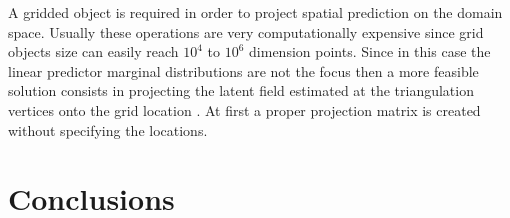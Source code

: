 \documentclass[
  12pt,
  a4paper,
  oneside]{book}
\theoremstyle{definition}
\theoremstyle{definition}
\theoremstyle{definition}
\theoremstyle{remark}
\begin{document}
A gridded object is required in order to project spatial prediction on the domain space. Usually these operations are very computationally expensive since grid objects size can easily reach \(10^4\) to \(10^6\) dimension points. Since in this case the linear predictor marginal distributions are not the focus then a more feasible solution consists in projecting the latent field estimated at the triangulation vertices onto the grid location \citeyearpar{Blangiardo-Cameletti}. At first a proper projection matrix is created without specifying the locations.

\hypertarget{conclusions}{%
\chapter{Conclusions}\label{conclusions}}
\end{document}
